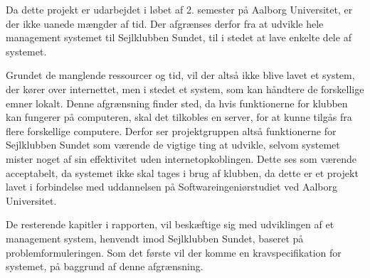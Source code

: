 Da dette projekt er udarbejdet i løbet af 2. semester på Aalborg Universitet, er der ikke uanede mængder af tid.
Der afgrænses derfor fra at udvikle hele management systemet til Sejlklubben Sundet, til i stedet at lave enkelte dele af systemet.

Grundet de manglende ressourcer og tid, vil der altså ikke blive lavet et system, der kører over internettet, men i stedet et system, som kan håndtere de forskellige emner lokalt. 
Denne afgrænsning finder sted, da hvis funktionerne for klubben kan fungerer på computeren, skal det tilkobles en server, for at kunne tilgås fra flere forskellige computere.  
Derfor ser projektgruppen altså funktionerne for Sejlklubben Sundet som værende de vigtige ting at udvikle, selvom systemet mister noget af sin effektivitet uden internetopkoblingen.
Dette ses som værende acceptabelt, da systemet ikke skal tages i brug af klubben, da dette er et projekt lavet i forbindelse med uddannelsen på Softwareingeniørstudiet ved Aalborg Universitet.

De resterende kapitler i rapporten, vil beskæftige sig med udviklingen af et management system, henvendt imod Sejlklubben Sundet, baseret på problemformuleringen. 
Som det første vil der komme en kravspecifikation for systemet, på baggrund af denne afgrænsning.
